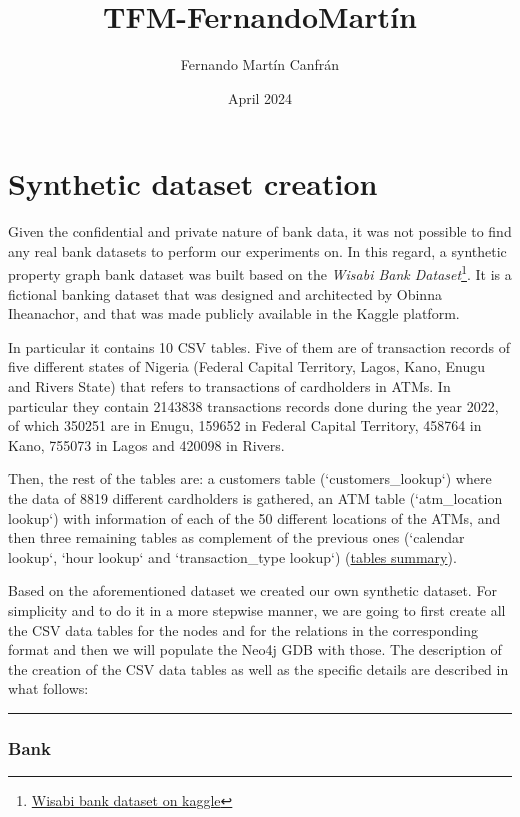 \documentclass{article}
\title{TFM-FernandoMartín}
\author{Fernando Martín Canfrán}
\date{April 2024}
\begin{document}
\section{Synthetic dataset creation}

Given the confidential and private nature of bank data, it was not possible to find
any real bank datasets to perform our experiments on. In this regard, a synthetic property
graph bank dataset was built based on the \emph{Wisabi Bank Dataset}\footnote{\href{https://www.kaggle.com/datasets/obinnaiheanachor/wisabi-bank-dataset}{Wisabi bank dataset on kaggle}}. It is a fictional banking dataset that 
was designed and architected by Obinna Iheanachor, and that was made publicly available in
the Kaggle platform.
 

In particular it contains 10 CSV tables. Five of them are of transaction records of five 
different states of Nigeria (Federal Capital Territory, Lagos, Kano, Enugu and Rivers State) 
that refers to transactions of cardholders in ATMs. In particular they contain 2143838 
transactions records done during the year 2022, of which 350251 are in Enugu, 159652 in 
Federal Capital Territory, 458764 in Kano, 755073 in Lagos and 420098 in Rivers.

Then, the rest of the tables are: a customers table (`customers\_lookup`) where the data
of 8819 different cardholders is gathered, an ATM table (`atm\_location lookup`) with
information of each of the 50 different locations of the ATMs, and then three remaining
tables as complement of the previous ones (`calendar lookup`, `hour lookup` and 
`transaction\_type lookup`) 
(\href{https://app.diagrams.net/#G1eAn47YR7-zPNE5KgStkA6_IJcxZRYgX8#%7B%22pageId%22%3A%22R2lEEEUBdFMjLlhIrx00%22%7D}{tables summary}).

Based on the aforementioned dataset we created our own synthetic dataset. For simplicity 
and to do it in a more stepwise manner, we are going to first create all the CSV data tables
for the nodes and for the relations in the corresponding format and then we will populate 
the Neo4j GDB with those.
The description of the creation of the CSV data tables as well as the specific details are 
described in what follows:\\

\textcolor{green}{\rule{\linewidth}{0.4mm}}

\subsubsection*{Bank}
\end{document}
